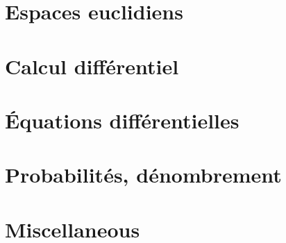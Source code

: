 \documentclass[12pt]{scrartcl}
\begin{document}
    \section{Espaces euclidiens}
    
    \newpage

    \section{Calcul différentiel}
    
    \newpage

    \section{Équations différentielles}
    
    \newpage

    \section{Probabilités, dénombrement}
    
    \newpage

    \section{Miscellaneous}
    
    \newpage
\end{document}
